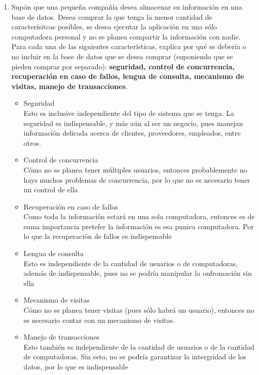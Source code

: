 \documentclass[10pt]{article}
\begin{document}
\begin{enumerate}[label=\alph*.]
        \item {
            Supón que una pequeña compañía desea almacenar su información en una
            base de datos. Desea comprar la que tenga la menor cantidad de 
            caracterísitcas posibles, se desea ejecutar la aplicación en una 
            sólo computadora personal y no se planea compartir la información con
            nadie. Para cada una de las siguientes características, explica por
            qué se debería o no incluir en la base de datos que se desea comprar
            (suponiendo que se pieden comprar por separado): \textbf{seguridad, 
            control de concurrencia, recuperación en caso de fallos, lengua de 
            consulta, mecanismo de visitas, manejo de transacciones}.
            \begin{itemize}
                \item {Seguridad \\
                Esto es inclusive independiente del tipo de sistema que se 
                tenga. La seguridad es indispensable, y más aún al ser un 
                negocio, pues manejan información delicada acerca de clientes,
                proveedores, empleados, entre otros.}
                \item {Control de concurrencia \\
                Cómo no se planea tener múltiples usuarios, entonces probablemente
                no hays muchos problemas de concurrencia, por lo que no es 
                necesario tener un control de ella}
                \item {Recuperación en caso de fallos \\
                Como toda la información estará en una sola computadora, 
                entonces es de suma importancia pretefer la información es esa 
                punica computadora. Por lo que la recuperación de fallos es 
                indispensable}
                \item {Lengua de consulta \\
                Esto es independiente de la cantidad de usuarios o de 
                computadoras, además de indispensable, pues no se podría 
                manipular la onfromación sin ella}
                \item {Mecanismo de visitas \\
                Cómo no se planea tener visitas (pues sólo habrá un usuario), 
                entonces no es necesario contar con un mecanismo de visitas.
                }
                \item {Manejo de transacciones \\
                Esto también es independiente de la cantidad de usuarios o de la
                cantidad de computadoras. Sin esto, no se podría garantizar la 
                intergridad de los datos, por lo que es indispensable}\\
            \end{itemize}
        }
    \end{enumerate}
\end{document}
